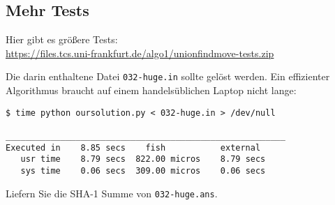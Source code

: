 \documentclass{uebung_cs}
\begin{document}
\begin{aufgabe}
  \subsection*{Mehr Tests}
  Hier gibt es größere Tests:\\
  \small\url{https://files.tcs.uni-frankfurt.de/algo1/unionfindmove-tests.zip}

  Die darin enthaltene Datei \verb|032-huge.in| sollte gelöst werden.
  Ein effizienter Algorithmus braucht auf einem handelsüblichen Laptop nicht lange:
  \begin{verbatim}
$ time python oursolution.py < 032-huge.in > /dev/null

________________________________________________________
Executed in    8.85 secs    fish           external
   usr time    8.79 secs  822.00 micros    8.79 secs
   sys time    0.06 secs  309.00 micros    0.06 secs
  \end{verbatim}
  Liefern Sie die SHA-1 Summe von \verb|032-huge.ans|.

\end{aufgabe}
\end{document}
